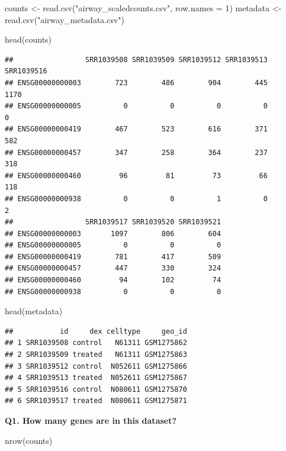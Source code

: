 \documentclass[
]{article}
\newenvironment{Shaded}{\begin{snugshade}}{\end{snugshade}}
\newcommand{\AttributeTok}[1]{\textcolor[rgb]{0.77,0.63,0.00}{#1}}
\newcommand{\DecValTok}[1]{\textcolor[rgb]{0.00,0.00,0.81}{#1}}
\newcommand{\FunctionTok}[1]{\textcolor[rgb]{0.00,0.00,0.00}{#1}}
\newcommand{\NormalTok}[1]{#1}
\newcommand{\OtherTok}[1]{\textcolor[rgb]{0.56,0.35,0.01}{#1}}
\newcommand{\StringTok}[1]{\textcolor[rgb]{0.31,0.60,0.02}{#1}}
\begin{document}
\begin{Shaded}
\begin{Highlighting}[]
\NormalTok{counts }\OtherTok{\textless{}{-}} \FunctionTok{read.csv}\NormalTok{(}\StringTok{"airway\_scaledcounts.csv"}\NormalTok{, }\AttributeTok{row.names =} \DecValTok{1}\NormalTok{)}
\NormalTok{metadata }\OtherTok{\textless{}{-}}  \FunctionTok{read.csv}\NormalTok{(}\StringTok{"airway\_metadata.csv"}\NormalTok{)}

\FunctionTok{head}\NormalTok{(counts)}
\end{Highlighting}
\end{Shaded}

\begin{verbatim}
##                 SRR1039508 SRR1039509 SRR1039512 SRR1039513 SRR1039516
## ENSG00000000003        723        486        904        445       1170
## ENSG00000000005          0          0          0          0          0
## ENSG00000000419        467        523        616        371        582
## ENSG00000000457        347        258        364        237        318
## ENSG00000000460         96         81         73         66        118
## ENSG00000000938          0          0          1          0          2
##                 SRR1039517 SRR1039520 SRR1039521
## ENSG00000000003       1097        806        604
## ENSG00000000005          0          0          0
## ENSG00000000419        781        417        509
## ENSG00000000457        447        330        324
## ENSG00000000460         94        102         74
## ENSG00000000938          0          0          0
\end{verbatim}

\begin{Shaded}
\begin{Highlighting}[]
\FunctionTok{head}\NormalTok{(metadata)}
\end{Highlighting}
\end{Shaded}

\begin{verbatim}
##           id     dex celltype     geo_id
## 1 SRR1039508 control   N61311 GSM1275862
## 2 SRR1039509 treated   N61311 GSM1275863
## 3 SRR1039512 control  N052611 GSM1275866
## 4 SRR1039513 treated  N052611 GSM1275867
## 5 SRR1039516 control  N080611 GSM1275870
## 6 SRR1039517 treated  N080611 GSM1275871
\end{verbatim}

\textbf{Q1. How many genes are in this dataset?}

\begin{Shaded}
\begin{Highlighting}[]
\FunctionTok{nrow}\NormalTok{(counts)}
\end{Highlighting}
\end{Shaded}
\end{document}
